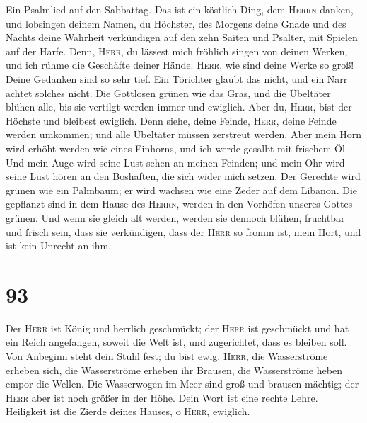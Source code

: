  Ein Psalmlied auf den Sabbattag.  Das ist
ein köstlich Ding, dem \textsc{Herrn} danken, und lobsingen deinem
Namen, du Höchster,  des Morgens deine Gnade und des
Nachts deine Wahrheit verkündigen  auf den zehn Saiten und
Psalter, mit Spielen auf der Harfe.  Denn, \textsc{Herr},
du lässest mich fröhlich singen von deinen Werken, und ich rühme die
Geschäfte deiner Hände.  \textsc{Herr}, wie sind deine
Werke so groß! Deine Gedanken sind so sehr tief.  Ein
Törichter glaubt das nicht, und ein Narr achtet solches nicht.
 Die Gottlosen grünen wie das Gras, und die Übeltäter
blühen alle, bis sie vertilgt werden immer und ewiglich. 
Aber du, \textsc{Herr}, bist der Höchste und bleibest ewiglich.
 Denn siehe, deine Feinde, \textsc{Herr}, deine Feinde
werden umkommen; und alle Übeltäter müssen zerstreut werden.
 Aber mein Horn wird erhöht werden wie eines Einhorns,
und ich werde gesalbt mit frischem Öl.  Und mein Auge
wird seine Lust sehen an meinen Feinden; und mein Ohr wird seine Lust
hören an den Boshaften, die sich wider mich setzen.  Der
Gerechte wird grünen wie ein Palmbaum; er wird wachsen wie eine Zeder
auf dem Libanon.  Die gepflanzt sind in dem Hause des
\textsc{Herrn}, werden in den Vorhöfen unseres Gottes grünen.
 Und wenn sie gleich alt werden, werden sie dennoch
blühen, fruchtbar und frisch sein,  dass sie verkündigen,
dass der \textsc{Herr} so fromm ist, mein Hort, und ist kein Unrecht an
ihm.

\hypertarget{section-92}{%
\section{93}\label{section-92}}

 Der \textsc{Herr} ist König und herrlich geschmückt; der
\textsc{Herr} ist geschmückt und hat ein Reich angefangen, soweit die
Welt ist, und zugerichtet, dass es bleiben soll.  Von
Anbeginn steht dein Stuhl fest; du bist ewig. 
\textsc{Herr}, die Wasserströme erheben sich, die Wasserströme erheben
ihr Brausen, die Wasserströme heben empor die Wellen.  Die
Wasserwogen im Meer sind groß und brausen mächtig; der \textsc{Herr}
aber ist noch größer in der Höhe.  Dein Wort ist eine
rechte Lehre. Heiligkeit ist die Zierde deines Hauses, o \textsc{Herr},
ewiglich.

